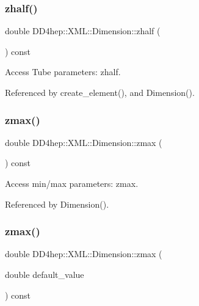 \hypertarget{struct_d_d4hep_1_1_x_m_l_1_1_dimension_a701f5ce5b766ba12d0a7db3bc0333cd1}{}\label{struct_d_d4hep_1_1_x_m_l_1_1_dimension_a701f5ce5b766ba12d0a7db3bc0333cd1} 
\subsubsection{\texorpdfstring{zhalf()}{zhalf()}}
{\footnotesize\ttfamily double D\+D4hep\+::\+X\+M\+L\+::\+Dimension\+::zhalf (\begin{DoxyParamCaption}{ }\end{DoxyParamCaption}) const}



Access Tube parameters\+: zhalf. 



Referenced by create\+\_\+element(), and Dimension().

\hypertarget{struct_d_d4hep_1_1_x_m_l_1_1_dimension_acc8b08a3379fa8297c4068fe007fc892}{}\label{struct_d_d4hep_1_1_x_m_l_1_1_dimension_acc8b08a3379fa8297c4068fe007fc892} 
\subsubsection{\texorpdfstring{zmax()}{zmax()}\hspace{0.1cm}{\footnotesize\ttfamily [1/2]}}
{\footnotesize\ttfamily double D\+D4hep\+::\+X\+M\+L\+::\+Dimension\+::zmax (\begin{DoxyParamCaption}{ }\end{DoxyParamCaption}) const}



Access min/max parameters\+: zmax. 



Referenced by Dimension().

\hypertarget{struct_d_d4hep_1_1_x_m_l_1_1_dimension_aa17a3e5ef448c00dc4b1ef1dd0a0c6a8}{}\label{struct_d_d4hep_1_1_x_m_l_1_1_dimension_aa17a3e5ef448c00dc4b1ef1dd0a0c6a8} 
\subsubsection{\texorpdfstring{zmax()}{zmax()}\hspace{0.1cm}{\footnotesize\ttfamily [2/2]}}
{\footnotesize\ttfamily double D\+D4hep\+::\+X\+M\+L\+::\+Dimension\+::zmax (\begin{DoxyParamCaption}\item[{double}]{default\+\_\+value }\end{DoxyParamCaption}) const}



